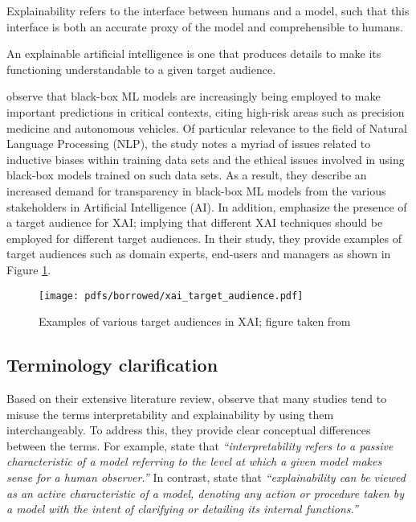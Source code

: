 \begin{definition}
  Explainability refers to the interface between humans and a model, such that
  this interface is both an accurate proxy of the model and comprehensible to
  humans.
\end{definition}

\begin{definition}
  An explainable artificial intelligence is one that produces details to make
  its functioning understandable to a given target audience.
\end{definition}

\citet{arrieta2020explainable} observe that black-box ML models are increasingly
being employed to make important predictions in critical contexts, citing
high-risk areas such as precision medicine and autonomous vehicles. Of
particular relevance to the field of Natural Language Processing (NLP), the
study notes a myriad of issues related to inductive biases within training data
sets and the ethical issues involved in using black-box models trained on such
data sets. As a result, they describe an increased demand for transparency in
black-box ML models from the various stakeholders in Artificial Intelligence
(AI). In addition, \citet{arrieta2020explainable} emphasize the presence of a
target audience for XAI; implying that different XAI techniques should be
employed for different target audiences. In their study, they provide examples
of target audiences such as domain experts, end-users and managers as shown in
Figure \ref{fig:xai_target_audience}.

\begin{figure}[t]
  \centering \texttt{[image: pdfs/borrowed/xai\_target\_audience.pdf]}
  \caption{Examples of various target audiences in XAI; figure taken from
    \citet{arrieta2020explainable}}
  \label{fig:xai_target_audience}
\end{figure}

\subsection{Terminology clarification}

\label{section:xai_terminology}

Based on their extensive literature review, \citet{arrieta2020explainable}
observe that many studies tend to misuse the terms interpretability and
explainability by using them interchangeably. To address this, they provide
clear conceptual differences between the terms. For example, \citet[Page 3,
Section 2.1]{arrieta2020explainable} state that \textit{``interpretability
  refers to a passive characteristic of a model referring to the level at which
  a given model makes sense for a human observer.''} In contrast, \citet[Page 3,
Section 2.1]{arrieta2020explainable} state that \textit{``explainability can be
  viewed as an active characteristic of a model, denoting any action or
  procedure taken by a model with the intent of clarifying or detailing its
  internal functions.''}

